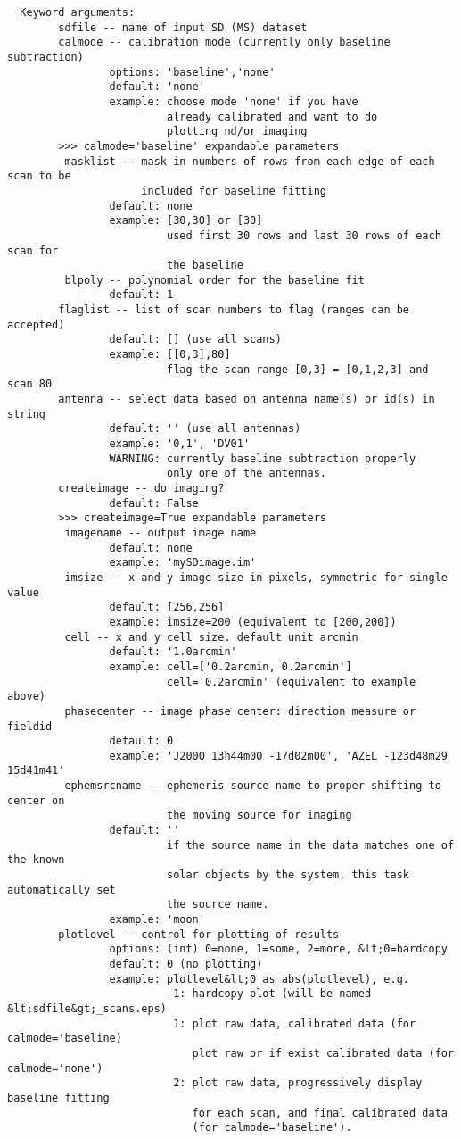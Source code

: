 \begin{verbatim}
  Keyword arguments:
        sdfile -- name of input SD (MS) dataset
        calmode -- calibration mode (currently only baseline subtraction)
                options: 'baseline','none'
                default: 'none'
                example: choose mode 'none' if you have
                         already calibrated and want to do
                         plotting nd/or imaging
        >>> calmode='baseline' expandable parameters
         masklist -- mask in numbers of rows from each edge of each scan to be 
                     included for baseline fitting
                default: none
                example: [30,30] or [30]
                         used first 30 rows and last 30 rows of each scan for 
                         the baseline
         blpoly -- polynomial order for the baseline fit
                default: 1
        flaglist -- list of scan numbers to flag (ranges can be accepted)
                default: [] (use all scans)
                example: [[0,3],80]
                         flag the scan range [0,3] = [0,1,2,3] and scan 80
        antenna -- select data based on antenna name(s) or id(s) in string
                default: '' (use all antennas)
                example: '0,1', 'DV01'
                WARNING: currently baseline subtraction properly
                         only one of the antennas.
        createimage -- do imaging?
                default: False
        >>> createimage=True expandable parameters
         imagename -- output image name
                default: none
                example: 'mySDimage.im'
         imsize -- x and y image size in pixels, symmetric for single value
                default: [256,256]
                example: imsize=200 (equivalent to [200,200])
         cell -- x and y cell size. default unit arcmin
                default: '1.0arcmin'
                example: cell=['0.2arcmin, 0.2arcmin']
                         cell='0.2arcmin' (equivalent to example above)
         phasecenter -- image phase center: direction measure or fieldid
                default: 0
                example: 'J2000 13h44m00 -17d02m00', 'AZEL -123d48m29 15d41m41'
         ephemsrcname -- ephemeris source name to proper shifting to center on 
                         the moving source for imaging
                default: ''
                         if the source name in the data matches one of the known 
                         solar objects by the system, this task automatically set 
                         the source name.
                example: 'moon'
        plotlevel -- control for plotting of results
                options: (int) 0=none, 1=some, 2=more, &lt;0=hardcopy
                default: 0 (no plotting)
                example: plotlevel&lt;0 as abs(plotlevel), e.g.
                         -1: hardcopy plot (will be named &lt;sdfile&gt;_scans.eps)
                          1: plot raw data, calibrated data (for calmode='baseline)
                             plot raw or if exist calibrated data (for calmode='none')
                          2: plot raw data, progressively display baseline fitting 
                             for each scan, and final calibrated data
                             (for calmode='baseline').

\end{verbatim}
